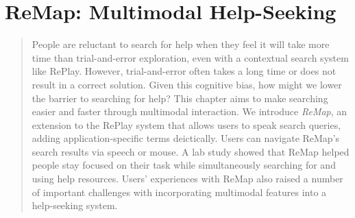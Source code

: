 \chapter{ReMap: Multimodal Help-Seeking}
\label{chapter:remap}
\begin{quote}
People are reluctant to search for help when they feel it will take more time than trial-and-error exploration, even with a contextual search system like RePlay. However, trial-and-error often takes a long time or does not result in a correct solution. Given this cognitive bias, how might we lower the barrier to searching for help? This chapter aims to make searching easier and faster through multimodal interaction. We introduce \textit{ReMap}, an extension to the RePlay system that allows users to speak search queries, adding application-specific terms deictically. Users can navigate ReMap's search results via speech or mouse. A lab study showed that ReMap helped people stay focused on their task while simultaneously searching for and using help resources. Users' experiences with ReMap also raised a number of important challenges with incorporating multimodal features into a help-seeking system.
\end{quote}








